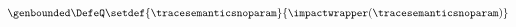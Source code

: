 \begin{eqnarray*}
  \genbounded\DefeQ
  \setdef{\tracesemanticsnoparam}{\impactwrapper(\tracesemanticsnoparam)}
\end{eqnarray*}

